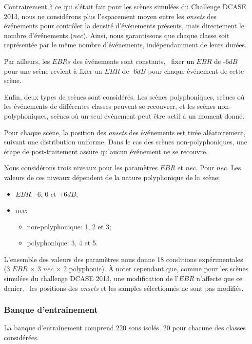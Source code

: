 Contrairement à ce qui s'était fait pour les scènes simulées du Challenge DCASE 2013, nous ne considérons plus l'espacement moyen entre les \emph{onsets} des événements pour contrôler la densité d'événements présents, mais directement le nombre d'événements ($nec$). Ainsi, nous garantissons que chaque classe soit représentée par le même nombre d'événements, indépendamment de leurs durées.

Par ailleurs, les $EBRs$ des événements sont constants, \ie~fixer un $EBR$ de -6$dB$ pour une scène revient à fixer un $EBR$ de -6$dB$ pour chaque événement de cette scène.

Enfin, deux types de scènes sont considérés. Les scènes polyphoniques, scènes où les événements de différentes classes peuvent se recouvrer, et les scènes non-polyphoniques, scènes où un seul événement peut être actif à un moment donné.

Pour chaque scène, la position des \emph{onsets} des événements est tirée aléatoirement, suivant une distribution uniforme. Dans le cas des scènes non-polyphoniques, une étape de post-traitement assure qu'aucun événement ne se recouvre.

Nous considérons trois niveaux pour les paramètres $EBR$ et $nec$. Pour $nec$. Les valeurs de ces niveaux dépendent de la nature polyphonique de la scène:

\begin{itemize}
\item $EBR$: -6, 0 et +6$dB$;
\item $nec$: 
\begin{itemize}
\item non-polyphonique: 1, 2 et 3;
\item polyphonique: 3, 4 et 5.
\end{itemize}
\end{itemize}

L'ensemble des valeurs des paramètres nous donne 18 conditions expérimentales (3 $EBR$ $\times$ 3 $nec$ $\times$ 2 polyphonie). À noter cependant que, comme pour les scènes simulées du challenge DCASE 2013, une modification de l'$EBR$ n'affecte que ce denier, \ie~les positions des \emph{onsets} et les samples sélectionnés ne sont pas modifiés.

\subsubsection{Banque d'entraînement}

La banque d’entraînement comprend 220 sons isolés, 20 pour chacune des classes considérées.

